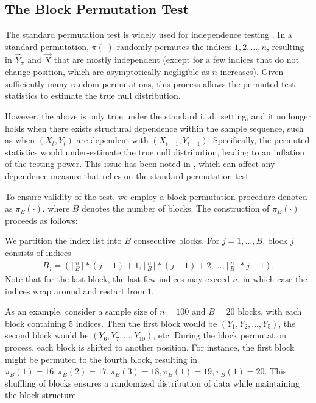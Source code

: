 \subsection{The Block Permutation Test}
The standard permutation test is widely used for independence testing \cite{GoodPermutationBook}. In a standard permutation, $\pi(\cdot)$ randomly permutes the indices $1, 2, \ldots, n$, resulting in $\vec{Y}_{\pi}$ and $\vec{X}$ that are mostly independent (except for a few indices that do not change position, which are asymptotically negligible as $n$ increases). Given sufficiently many random permutations, this process allows the permuted test statistics to estimate the true null distribution. 

However, the above is only true under the standard i.i.d.~setting, and it no longer holds when there exists structural dependence within the sample sequence, such as when $(X_t, Y_t)$ are dependent with $(X_{t-1}, Y_{t-1})$. Specifically, the permuted statistics would under-estimate the true null distribution, leading to an inflation of the testing power. This issue has been noted in \cite{Mantel2013,DiCiccio2017}, which can affect any dependence measure that relies on the standard permutation test.

To ensure validity of the test, we employ a block permutation procedure \cite{politis2003} denoted as $\pi_{B}(\cdot)$, where $B$ denotes the number of blocks. The construction of $\pi_{B}(\cdot)$ proceeds as follows: 

We partition the index list into $B$ consecutive blocks. For $j=1,\ldots,B$, block $j$ consists of indices
    \begin{align*}
        B_j=(\lceil \frac{n}{B} \rceil * (j-1)+1, \lceil \frac{n}{B} \rceil * (j-1)+2,\ldots, \lceil \frac{n}{B} \rceil * j -1).
    \end{align*}
Note that for the last block, the last few indices may exceed $n$, in which case the indices wrap around and restart from $1$. 

As an example, consider a sample size of $n = 100$ and $B = 20$ blocks, with each block containing $5$ indices. Then the first block would be $(Y_{1}, Y_{2}, ..., Y_{5})$, the second block would be $(Y_{6}, Y_{7}, ..., Y_{10})$, etc. During the block permutation process, each block is shifted to another position. For instance, the first block might be permuted to the fourth block, resulting in $\pi_{B}(1)=16,\pi_{B}(2)=17,\pi_{B}(3)=18,\pi_{B}(1)=19,\pi_{B}(1)=20$. This shuffling of blocks ensures a randomized distribution of data while maintaining the block structure.

